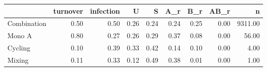 \begin{tabular}{lrrrrrrrr}
\toprule
 & turnover & infection & U & S & A\_r & B\_r & AB\_r & n \\
\midrule
Combination & 0.50 & 0.50 & 0.26 & 0.24 & 0.24 & 0.25 & 0.00 & 9311.00 \\
Mono A & 0.80 & 0.27 & 0.26 & 0.29 & 0.37 & 0.08 & 0.00 & 56.00 \\
Cycling & 0.10 & 0.39 & 0.33 & 0.42 & 0.14 & 0.10 & 0.00 & 4.00 \\
Mixing & 0.11 & 0.33 & 0.12 & 0.49 & 0.38 & 0.01 & 0.00 & 1.00 \\
\bottomrule
\end{tabular}
